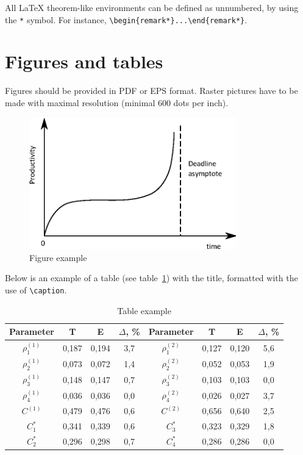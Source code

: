 \documentclass[11pt]{article}
\begin{document}
\begin{remark*}
All \LaTeX{} theorem-like environments can be defined as unnumbered, by using the \verb"*"  symbol. For instance, \verb"\begin{remark*}...\end{remark*}".
\end{remark*}

\section{Figures and tables}

Figures should be provided in PDF or EPS format. Raster pictures have
to be made with maximal resolution (minimal 600 dots per inch).

\begin{figure}[ht!]
   \centering
     \includegraphics[width=0.8\textwidth]{funny_graph_en}
    \caption {Figure example}
\label{fig:example_graph}
\end{figure}

Below is an example of a table (see table~\ref{tab:sampletable}) with the title, formatted with the use of \verb"\caption".

\begin{table}[ht!]\begin{center}
\begin{tabular}{|c||c|c|c||c||c|c|c|}\hline
  Parameter & T & E & $\Delta$, \% & Parameter & T & E & $\Delta$, \% \\ \hline \hline
  $\rho_{1}^{(1)}$ & 0,187 & 0,194 & 3,7 &  $\rho_{1}^{(2)}$ & 0,127 & 0,120 & 5,6 \\ \hline
  $\rho_{2}^{(1)}$ & 0,073 & 0,072 & 1,4 &  $\rho_{2}^{(2)}$ & 0,052 & 0,053 & 1,9 \\ \hline
  $\rho_{3}^{(1)}$ & 0,148 & 0,147 & 0,7 &  $\rho_{3}^{(2)}$ & 0,103 & 0,103 & 0,0 \\ \hline
  $\rho_{4}^{(1)}$ & 0,036 & 0,036 & 0,0 &  $\rho_{4}^{(2)}$ & 0,026 & 0,027 & 3,7 \\ \hline \hline
  $C^{(1)}$ & 0,479 & 0,476 & 0,6 & $C^{(2)}$ & 0,656 & 0,640 & 2,5 \\ \hline \hline
  $C_{1}^{*}$ & 0,341 & 0,339 & 0,6 & $C_{3}^{*}$ & 0,323 & 0,329 & 1,8 \\ \hline
  $C_{2}^{*}$ & 0,296 & 0,298 & 0,7 & $C_{4}^{*}$ & 0,286 & 0,286 & 0,0 \\ \hline
\end{tabular}\caption{Table example}\label{tab:sampletable}
\end{center}\end{table}
\end{document}
